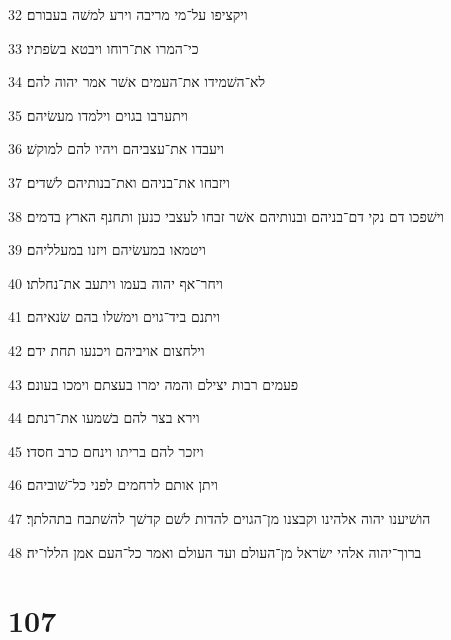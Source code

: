 \par 32 ויקציפו על־מי מריבה וירע למשׁה בעבורם׃
\par 33 כי־המרו את־רוחו ויבטא בשׂפתיו׃
\par 34 לא־השׁמידו את־העמים אשׁר אמר יהוה להם׃
\par 35 ויתערבו בגוים וילמדו מעשׂיהם׃
\par 36 ויעבדו את־עצביהם ויהיו להם למוקשׁ׃
\par 37 ויזבחו את־בניהם ואת־בנותיהם לשׁדים׃
\par 38 וישׁפכו דם נקי דם־בניהם ובנותיהם אשׁר זבחו לעצבי כנען ותחנף הארץ בדמים׃
\par 39 ויטמאו במעשׂיהם ויזנו במעלליהם׃
\par 40 ויחר־אף יהוה בעמו ויתעב את־נחלתו׃
\par 41 ויתנם ביד־גוים וימשׁלו בהם שׂנאיהם׃
\par 42 וילחצום אויביהם ויכנעו תחת ידם׃
\par 43 פעמים רבות יצילם והמה ימרו בעצתם וימכו בעונם׃
\par 44 וירא בצר להם בשׁמעו את־רנתם׃
\par 45 ויזכר להם בריתו וינחם כרב חסדו׃
\par 46 ויתן אותם לרחמים לפני כל־שׁוביהם׃
\par 47 הושׁיענו יהוה אלהינו וקבצנו מן־הגוים להדות לשׁם קדשׁך להשׁתבח בתהלתך׃
\par 48 ברוך־יהוה אלהי ישׂראל מן־העולם ועד העולם ואמר כל־העם אמן הללו־יה׃

\chapter{107}

